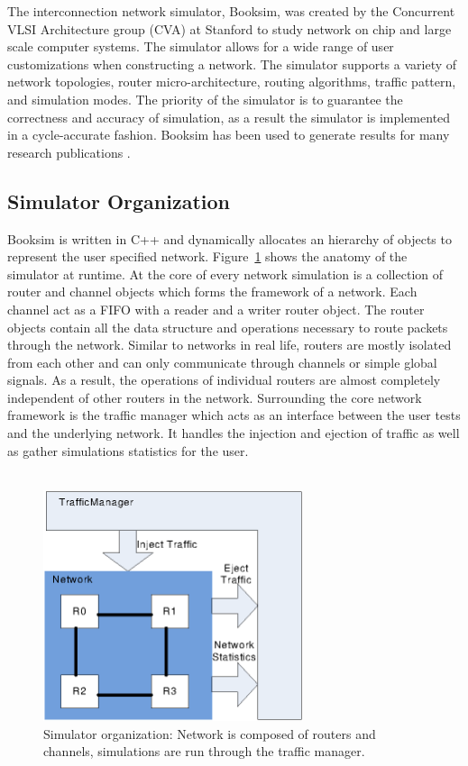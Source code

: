 
The interconnection network simulator, Booksim, was created by the Concurrent VLSI Architecture group (CVA) at Stanford to study network on chip and large scale computer systems. The simulator allows for a wide range of user customizations when constructing a network. The simulator supports a variety of network topologies, router micro-architecture, routing algorithms, traffic pattern, and simulation modes. The priority of the simulator is  to guarantee the correctness and accuracy of simulation, as a result the simulator is implemented in a cycle-accurate fashion. Booksim has been used to generate results for many research publications \cite{cdragon,KimISCA07,PPIN}. 
\subsection{Simulator Organization}
Booksim is written in C++ and dynamically allocates an hierarchy of objects to represent the user specified network. Figure~\ref{fig:simulator} shows the anatomy of the simulator at runtime. At the core of every network simulation is a collection of router and channel objects which forms the framework of a network. Each channel act as a FIFO with a reader and a writer router object. The router objects contain all the data structure and operations necessary to route packets through the network. Similar to networks in real life, routers are mostly isolated from each other and can only communicate through channels or simple global signals. As a result, the operations of individual routers are almost completely independent of other routers in the network. Surrounding the core network framework is the traffic manager which acts as an interface between the user tests and the underlying network. It handles the injection and ejection of traffic as well as gather simulations statistics for the user. \\
~\\
\begin{figure}[h]
\centering
\includegraphics[width=3in]{simulator.eps}
\caption{Simulator organization: Network is composed of routers and channels, simulations are run through the traffic manager. }
\label{fig:simulator}
\end{figure}
